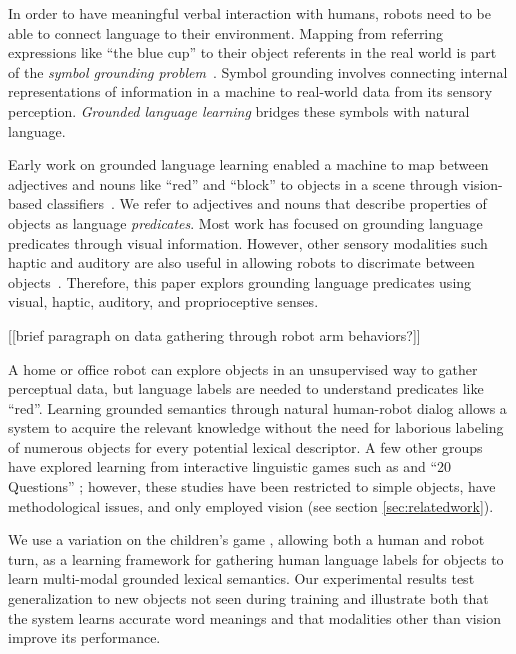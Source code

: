 In order to have meaningful verbal interaction with humans, robots need to be able to connect language to their environment. 
Mapping from referring expressions like ``the blue cup'' to their object referents in the real world is part of the \textit{symbol grounding problem}~\cite{harnad:phys90}. 
Symbol grounding involves connecting internal representations of information in a machine to real-world data from its sensory perception. \textit{Grounded language learning} bridges these symbols with natural language. 

Early work on grounded language learning enabled a machine to map between adjectives and nouns like ``red'' and ``block'' to objects in a scene through vision-based classifiers~\cite{roy:evocomm01}.
We refer to adjectives and nouns that describe properties of objects as language \textit{predicates}.
Most work has focused on grounding language predicates through visual information.
However, other sensory modalities such haptic and auditory are also useful in allowing robots to discrimate between objects~\cite{sinapov:icra14}.
Therefore, this paper explors grounding language predicates using visual, haptic, auditory, and proprioceptive senses. 

[[brief paragraph on data gathering through robot arm behaviors?]]

A home or office robot can explore objects in an unsupervised way to gather perceptual data, but language labels are needed to understand predicates like ``red''.
Learning grounded semantics through natural human-robot dialog allows a system to acquire the relevant knowledge without the need for laborious labeling of numerous objects for every potential lexical descriptor.
A few other groups have explored learning from interactive linguistic games such as \ispy and ``20 Questions'' \cite{parde:ijcai15,vogel:aaai10}; however, these studies have been restricted to simple objects, have methodological issues, and only employed vision (see section \ref{sec:relatedwork}).

We use a variation on the children's game \ispy, allowing both a human and robot turn, as a learning framework for gathering human language labels for objects to learn multi-modal grounded lexical semantics.
Our experimental results test generalization to new objects not seen during training and illustrate both that the system learns accurate word meanings and that modalities other than vision improve its performance.